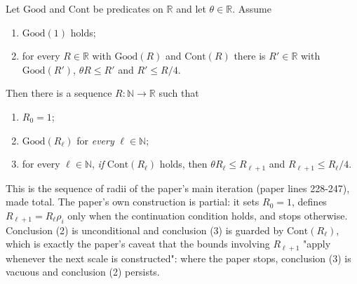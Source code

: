 \begin{lemma}
Let $\mathrm{Good}$ and $\mathrm{Cont}$ be predicates on $\mathbb{R}$ and let
$\theta\in\mathbb{R}$.  Assume
\begin{enumerate}
\item[(H1)] $\mathrm{Good}(1)$ holds;
\item[(H2)] for every $R\in\mathbb{R}$ with $\mathrm{Good}(R)$ and $\mathrm{Cont}(R)$ there is
$R'\in\mathbb{R}$ with $\mathrm{Good}(R')$, $\theta R\le R'$ and $R'\le R/4$.
\end{enumerate}
Then there is a sequence $R\colon\mathbb{N}\to\mathbb{R}$ such that
\begin{enumerate}
\item $R_0=1$;
\item $\mathrm{Good}(R_\ell)$ for \emph{every} $\ell\in\mathbb{N}$;
\item for every $\ell\in\mathbb{N}$, \emph{if} $\mathrm{Cont}(R_\ell)$ holds, then
$\theta R_\ell\le R_{\ell+1}$ and $R_{\ell+1}\le R_\ell/4$.
\end{enumerate}

This is the sequence of radii of the paper's main iteration (paper lines 228-247), made total.
The paper's own construction is partial: it sets $R_0=1$, defines $R_{\ell+1}=R_\ell\rho_i$ only
when the continuation condition holds, and stops otherwise.  Conclusion (2) is unconditional
and conclusion (3) is guarded by $\mathrm{Cont}(R_\ell)$, which is exactly the paper's caveat
that the bounds involving $R_{\ell+1}$ "apply whenever the next scale is constructed": where the
paper stops, conclusion (3) is vacuous and conclusion (2) persists.
\end{lemma}
